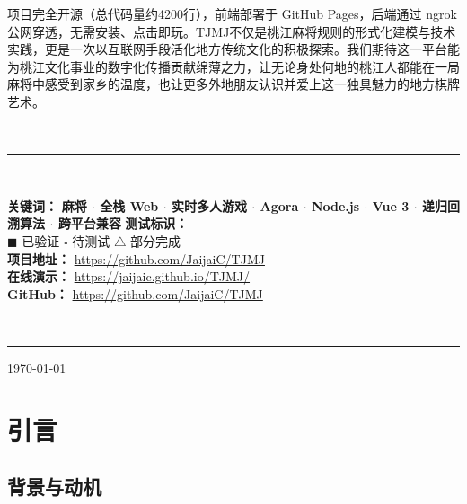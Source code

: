 \documentclass[11pt,a4paper]{article}
\begin{document}
\begin{center}
\begin{minipage}{0.95\linewidth}
项目完全开源（总代码量约4200行），前端部署于 GitHub Pages，后端通过 ngrok 公网穿透，无需安装、点击即玩。TJMJ不仅是桃江麻将规则的形式化建模与技术实践，更是一次以互联网手段活化地方传统文化的积极探索。我们期待这一平台能为桃江文化事业的数字化传播贡献绵薄之力，让无论身处何地的桃江人都能在一局麻将中感受到家乡的温度，也让更多外地朋友认识并爱上这一独具魅力的地方棋牌艺术。
\end{minipage}\\[2pt]
{\color{cyan!60!black}\rule{\linewidth}{0.5pt}}\\[2pt]
\begin{minipage}{0.95\linewidth}
\small\textbf{\color{blue!60!black}关键词：} \textbf{麻将 $\cdot$ 全栈 Web $\cdot$ 实时多人游戏 $\cdot$ Agora $\cdot$ Node.js $\cdot$ Vue 3 $\cdot$ 递归回溯算法 $\cdot$ 跨平台兼容}
\textbf{\color{blue!60!black}测试标识：} \\[2pt] $\blacksquare$ 已验证 \quad $\square$ 待测试 \quad $\triangle$ 部分完成 \\[2pt]
\textbf{\color{blue!60!black}项目地址：} \url{https://github.com/JaijaiC/TJMJ} \\
\textbf{\color{blue!60!black}在线演示：} \url{https://jaijaic.github.io/TJMJ/} \\
\textbf{\color{blue!60!black}GitHub：} \url{https://github.com/JaijaiC/TJMJ}
\end{minipage}\\[4pt]
{\color{cyan!60!black}\rule{\linewidth}{0.5pt}}
\end{center}

\vspace{6pt}
\begin{center}
{\small\color{gray}\today}
\end{center}

\newpage
\renewcommand{\contentsname}{\begin{center}目录\end{center}}
\tableofcontents
\newpage

\section{引言}

\subsection{背景与动机}
\end{document}
